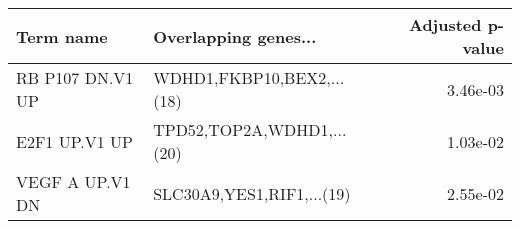 \begin{tabular}{llr}
\toprule
       Term name &      Overlapping genes... &  Adjusted p-value \\
\midrule
RB P107 DN.V1 UP & WDHD1,FKBP10,BEX2,...(18) &          3.46e-03 \\
   E2F1 UP.V1 UP & TPD52,TOP2A,WDHD1,...(20) &          1.03e-02 \\
 VEGF A UP.V1 DN & SLC30A9,YES1,RIF1,...(19) &          2.55e-02 \\
\bottomrule
\end{tabular}
